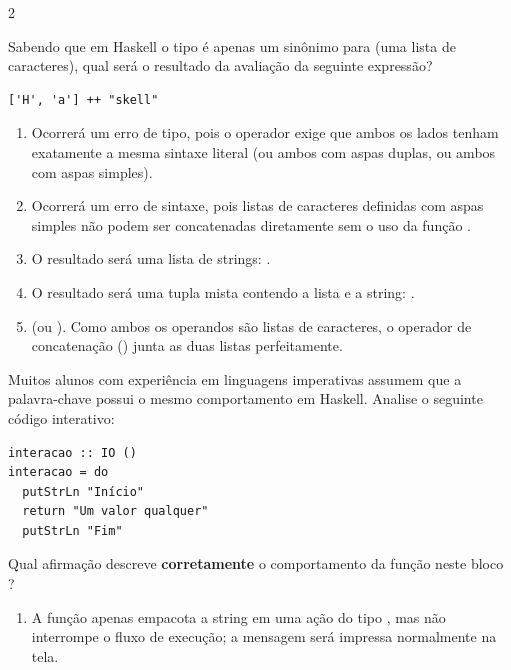 \documentclass[a4paper,10pt,brazil]{article}
\begin{document}
\begin{multicols}{2}
\begin{enumerate}
\end{enumerate}

Sabendo que em Haskell o tipo  é apenas um sinônimo para \haskellinline{[Char]} (uma lista de caracteres), qual será o resultado da avaliação da seguinte expressão?
\begin{verbatim}
['H', 'a'] ++ "skell"
\end{verbatim}

\begin{enumerate}
  \item Ocorrerá um erro de tipo, pois o operador \haskellinline{++} exige que ambos os lados tenham exatamente a mesma sintaxe literal (ou ambos com aspas duplas, ou ambos com aspas simples).

  \item Ocorrerá um erro de sintaxe, pois listas de caracteres definidas com aspas simples não podem ser concatenadas diretamente sem o uso da função .

  \item O resultado será uma lista de strings: \haskellinline{["Ha", "skell"]}.

  \item O resultado será uma tupla mista contendo a lista e a string: .

  \item {} (ou \haskellinline{['H', 'a', 's', 'k', 'e', 'l', 'l']}). Como ambos os operandos são listas de caracteres, o operador de concatenação (\haskellinline{++}) junta as duas listas perfeitamente.


\end{enumerate}

Muitos alunos com experiência em linguagens imperativas assumem que a palavra-chave  possui o mesmo comportamento em Haskell. Analise o seguinte código interativo:

\begin{verbatim}
interacao :: IO ()
interacao = do
  putStrLn "Início"
  return "Um valor qualquer"
  putStrLn "Fim"
\end{verbatim}

Qual afirmação descreve \textbf{corretamente} o comportamento da função  neste bloco ?

\begin{enumerate}
  \item A função  apenas empacota a string em uma ação do tipo , mas não interrompe o fluxo de execução; a mensagem  será impressa normalmente na tela.


\end{enumerate}
\end{multicols}
\end{document}

